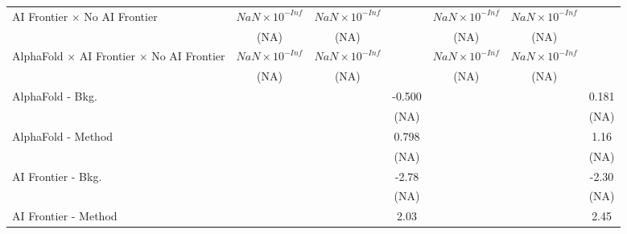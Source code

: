 \begin{tabular}{lcccccc}
   AI Frontier $\times$ No AI Frontier                                        & $NaN\times 10^{-Inf}$  & $NaN\times 10^{-Inf}$  &                        & $NaN\times 10^{-Inf}$  & $NaN\times 10^{-Inf}$  &   \\   
                                                                              & (NA)                   & (NA)                   &                        & (NA)                   & (NA)                   &   \\   
   AlphaFold $\times$ AI Frontier $\times$ No AI Frontier                     & $NaN\times 10^{-Inf}$  & $NaN\times 10^{-Inf}$  &                        & $NaN\times 10^{-Inf}$  & $NaN\times 10^{-Inf}$  &   \\   
                                                                              & (NA)                   & (NA)                   &                        & (NA)                   & (NA)                   &   \\   
   AlphaFold - Bkg.                                                           &                        &                        & -0.500                 &                        &                        & 0.181\\   
                                                                              &                        &                        & (NA)                   &                        &                        & (NA)\\   
   AlphaFold - Method                                                         &                        &                        & 0.798                  &                        &                        & 1.16\\   
                                                                              &                        &                        & (NA)                   &                        &                        & (NA)\\   
   AI Frontier - Bkg.                                                         &                        &                        & -2.78                  &                        &                        & -2.30\\   
                                                                              &                        &                        & (NA)                   &                        &                        & (NA)\\   
   AI Frontier - Method                                                       &                        &                        & 2.03                   &                        &                        & 2.45\\   

\end{tabular}
